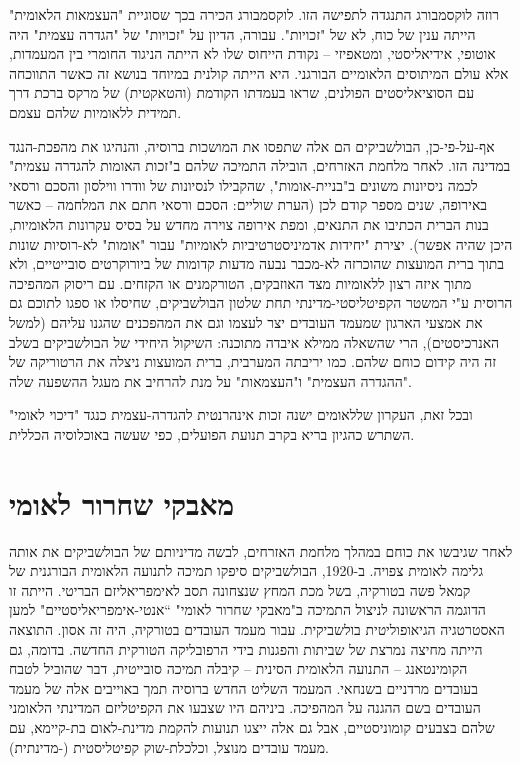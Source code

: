 רוזה לוקסמבורג התנגדה לתפישה הזו. לוקסמבורג הכירה בכך שסוגיית "העצמאות הלאומית" הייתה ענין של כוח, לא של "זכויות". עבורה, הדיון על "זכויות" של "הגדרה עצמית" היה אוטופי, אידיאליסטי, ומטאפיזי – נקודת הייחוס שלו לא הייתה הניגוד החומרי בין המעמדות, אלא עולם המיתוסים הלאומיים הבורגני. היא הייתה קולנית במיוחד בנושא זה כאשר התווכחה עם הסוציאליסטים הפולנים, שראו בעמדתו הקודמת (והטאקטית) של מרקס ברכת דרך תמידית ללאומיות שלהם עצמם.

אף-על-פי-כן, הבולשביקים הם אלה שתפסו את המושכות ברוסיה, והנהיגו את מהפכת-הנגד במדינה הזו. לאחר מלחמת האזרחים, הובילה התמיכה שלהם ב"זכות האומות להגדרה עצמית" לכמה ניסיונות משונים ב"בניית-אומות", שהקבילו לנסיונות של וודרו ווילסון והסכם ורסאי באירופה, שנים מספר קודם לכן (הערת שוליים: הסכם ורסאי חתם את המלחמה – כאשר בנות הברית הכתיבו את התנאים, ומפת אירופה צוירה מחדש על בסיס עקרונות הלאומיות, היכן שהיה אפשר). יצירת "יחידות אדמיניסטרטיביות לאומיות" עבור "אומות" לא-רוסיות שונות בתוך ברית המועצות שהוכרזה לא-מכבר נבעה מדעות קדומות של ביורוקרטים סובייטיים, ולא מתוך איזה רצון ללאומיות מצד האוזבקים, הטורקמנים או הקזחים. עם ריסוק המהפיכה הרוסית ע"י המשטר הקפיטליסטי-מדינתי תחת שלטון הבולשביקים, שחיסלו או ספגו לתוכם גם את אמצעי הארגון שמעמד העובדים יצר לעצמו וגם את המהפכנים שהגנו עליהם (למשל האנרכיסטים), הרי שהשאלה ממילא איבדה מתוכנה: השיקול היחידי של הבולשביקים בשלב זה היה קידום כוחם שלהם. כמו יריבתה המערבית, ברית המועצות ניצלה את הרטוריקה של "ההגדרה העצמית" ו"העצמאות" על מנת להרחיב את מעגל ההשפעה שלה.

ובכל זאת, העקרון שללאומים ישנה זכות אינהרנטית להגדרה-עצמית כנגד "דיכוי לאומי" השתרש כהגיון בריא בקרב תנועת הפועלים, כפי שעשה באוכלוסיה הכללית.



\section{מאבקי שחרור לאומי}

לאחר שגיבשו את כוחם במהלך מלחמת האזרחים, לבשה מדיניותם של הבולשביקים את אותה גלימה לאומית צפויה. ב-1920, הבולשביקים סיפקו תמיכה לתנועה הלאומית הבורגנית של קמאל פשה בטורקיה, בשל מכת המחץ שנצחונה תסב לאימפריאליזם הבריטי. הייתה זו הדוגמה הראשונה לניצול התמיכה ב"מאבקי שחרור לאומי" “אנטי-אימפריאליסטיים" למען האסטרטגיה הגיאופוליטית בולשביקית. עבור מעמד העובדים בטורקיה, היה זה אסון. התוצאה הייתה מחיצה נמרצת של שביתות והפגנות בידי הרפובליקה הטורקית החדשה. בדומה, גם הקומינטאנג – התנועה הלאומית הסינית – קיבלה תמיכה סובייטית, דבר שהוביל לטבח בעובדים מרדניים בשנחאי. המעמד השליט החדש ברוסיה תמך באוייבים אלה של מעמד העובדים בשם ההגנה על המהפיכה. ביניהם היו שצבעו את הקפיטליזם המדינתי הלאומני שלהם בצבעים קומוניסטיים, אבל גם אלה ייצגו תנועות להקמת מדינת-לאום בת-קיימא, עם מעמד עובדים מנוצל, וכלכלת-שוק קפיטליסטית (-מדינתית).


